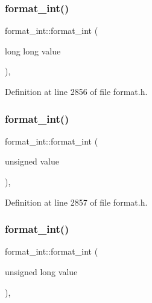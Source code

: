 \subsubsection{\texorpdfstring{format\+\_\+int()}{format\_int()}\hspace{0.1cm}{\footnotesize\ttfamily [3/6]}}
{\footnotesize\ttfamily format\+\_\+int\+::format\+\_\+int (\begin{DoxyParamCaption}\item[{long long}]{value }\end{DoxyParamCaption})\hspace{0.3cm}{\ttfamily [inline]}, {\ttfamily [explicit]}}



Definition at line 2856 of file format.\+h.

\mbox{\label{classformat__int_ad474137ee4a9d0545f0c8a2b3f6f6cf8}} 
\subsubsection{\texorpdfstring{format\+\_\+int()}{format\_int()}\hspace{0.1cm}{\footnotesize\ttfamily [4/6]}}
{\footnotesize\ttfamily format\+\_\+int\+::format\+\_\+int (\begin{DoxyParamCaption}\item[{unsigned}]{value }\end{DoxyParamCaption})\hspace{0.3cm}{\ttfamily [inline]}, {\ttfamily [explicit]}}



Definition at line 2857 of file format.\+h.

\mbox{\label{classformat__int_affccebfca726a18d469e726655401d35}} 
\subsubsection{\texorpdfstring{format\+\_\+int()}{format\_int()}\hspace{0.1cm}{\footnotesize\ttfamily [5/6]}}
{\footnotesize\ttfamily format\+\_\+int\+::format\+\_\+int (\begin{DoxyParamCaption}\item[{unsigned long}]{value }\end{DoxyParamCaption})\hspace{0.3cm}{\ttfamily [inline]}, {\ttfamily [explicit]}}



